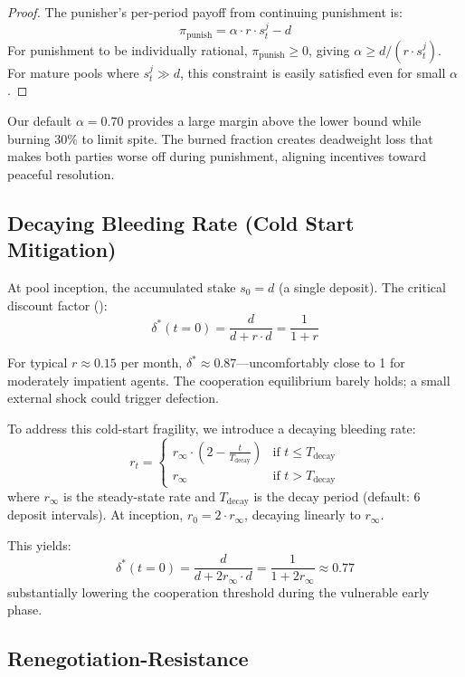\documentclass[12pt,a4paper]{article}
\begin{document}
\begin{proof}
The punisher's per-period payoff from continuing punishment is:
\[
\pi_{\text{punish}} = \alpha \cdot r \cdot s_t^j - d
\]
For punishment to be individually rational, $\pi_{\text{punish}} \geq 0$, giving $\alpha \geq d / (r \cdot s_t^j)$. For mature pools where $s_t^j \gg d$, this constraint is easily satisfied even for small $\alpha$.
\end{proof}

Our default $\alpha = 0.70$ provides a large margin above the lower bound while burning 30\% to limit spite. The burned fraction creates deadweight loss that makes both parties worse off during punishment, aligning incentives toward peaceful resolution.

\subsection{Decaying Bleeding Rate (Cold Start Mitigation)}
\label{sec:decaying-rate}

At pool inception, the accumulated stake $s_0 = d$ (a single deposit). The critical discount factor ():
\[
\delta^*(t=0) = \frac{d}{d + r \cdot d} = \frac{1}{1 + r}
\]

For typical $r \approx 0.15$ per month, $\delta^* \approx 0.87$---uncomfortably close to 1 for moderately impatient agents. The cooperation equilibrium barely holds; a small external shock could trigger defection.

To address this cold-start fragility, we introduce a decaying bleeding rate:
\[
r_t = \begin{cases}
r_\infty \cdot \left(2 - \frac{t}{T_{\text{decay}}}\right) & \text{if } t \leq T_{\text{decay}} \\
r_\infty & \text{if } t > T_{\text{decay}}
\end{cases}
\]
where $r_\infty$ is the steady-state rate and $T_{\text{decay}}$ is the decay period (default: 6 deposit intervals). At inception, $r_0 = 2 \cdot r_\infty$, decaying linearly to $r_\infty$.

This yields:
\[
\delta^*(t=0) = \frac{d}{d + 2r_\infty \cdot d} = \frac{1}{1 + 2r_\infty} \approx 0.77
\]
substantially lowering the cooperation threshold during the vulnerable early phase.

\subsection{Renegotiation-Resistance}
\label{sec:reneg-bleeding}
\end{document}
